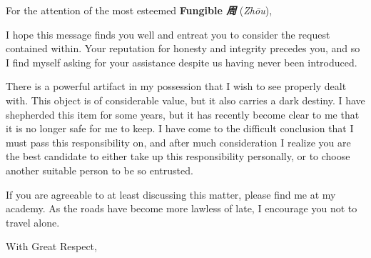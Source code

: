\documentclass[12pt]{letter}
\date{}
\begin{document}
\begin{letter}{}
\address{Two Thunders Academy\\Red Jade Center\\\textsl{江州} (\textit{Jiāngzhōu})}
\signature{
\LARGE
\textsl{思累} (\textit{Sī Lĕi})
}

\opening{For the attention of the most esteemed \textbf{Fungible \textsl{周}} (\textit{Zhōu}),}

I hope this message finds you well and entreat you to consider the request contained within.
Your reputation for honesty and integrity precedes you, and so I find myself asking for your
assistance despite us having never been introduced.

There is a powerful artifact in my possession that I wish to see properly dealt with. This
object is of considerable value, but it also carries a dark destiny. I have shepherded this
item for some years, but it has recently become clear to me that it is no longer safe for me
to keep. I have come to the difficult conclusion that I must pass this responsibility on, and
after much consideration I realize you are the best candidate to either take up this
responsibility personally, or to choose another suitable person to be so entrusted.

If you are agreeable to at least discussing this matter, please find me at my academy. As the
roads have become more lawless of late, I encourage you not to travel alone.

\closing{With Great Respect,}

\end{letter}
\end{document}
